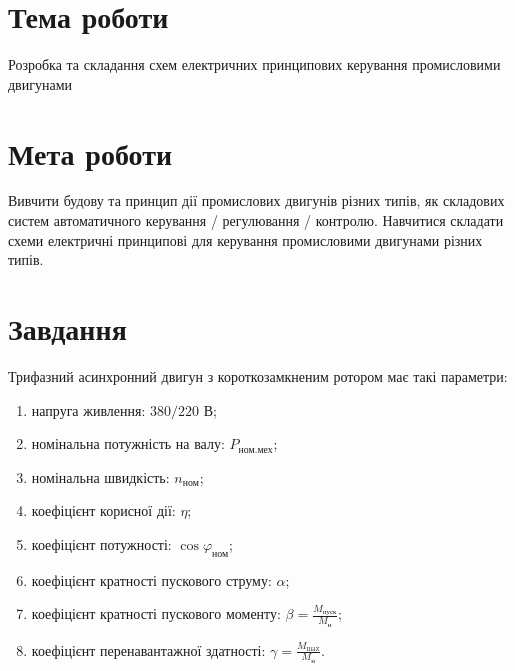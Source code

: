 \documentclass[a4paper]{article}
\begin{document}

    \section*{Тема роботи}
    Розробка та складання схем електричних принципових керування
    промисловими двигунами

    \section*{Мета роботи}
    Вивчити будову та принцип дії промислових двигунів
    різних типів, як складових систем автоматичного
    керування / регулювання / контролю. Навчитися складати схеми електричні
    принципові для керування промисловими двигунами різних типів.
    
    \section*{Завдання}
Трифазний асинхронний двигун з короткозамкненим ротором має такі параметри:
\begin{enumerate}
    \item напруга живлення: $380/220$ В;
    \item номінальна потужність на валу: $P_{\text{ном.мех}}$;
    \item номінальна швидкість: $n_{\text{ном}}$;
    \item коефіцієнт корисної дії: $\eta$;
    \item коефіцієнт потужності: $\cos \varphi_{\text{ном}}$;
    \item коефіцієнт кратності пускового струму: $\alpha$;
    \item коефіцієнт кратності пускового моменту: $\beta = \frac{M_{\text{пуск}}}{M_{\text{н}}}$;
    \item коефіцієнт перенавантажної здатності: $\gamma = \frac{M_{\text{max}}}{M_{\text{н}}}$.
\end{enumerate}

\newpage
\end{document}
